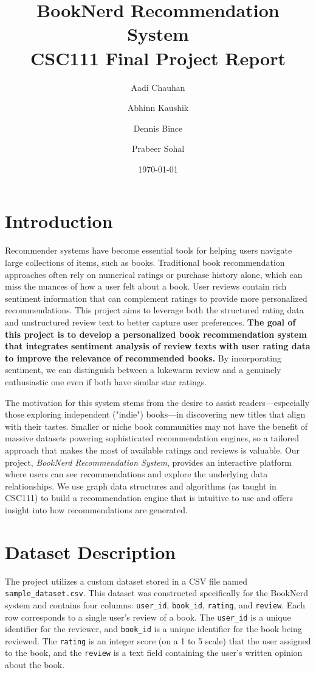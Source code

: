 \documentclass[12pt]{article}
\title{\textbf{BookNerd Recommendation System}\\
\large CSC111 Final Project Report}
\author{Aadi Chauhan \and Abhinn Kaushik \and Dennis Bince \and Prabeer Sohal}
\date{\today}
\begin{document}
\maketitle

\section{Introduction}

Recommender systems have become essential tools for helping users navigate large collections of items, such as books. Traditional book recommendation approaches often rely on numerical ratings or purchase history alone, which can miss the nuances of how a user felt about a book. User reviews contain rich sentiment information that can complement ratings to provide more personalized recommendations. This project aims to leverage both the structured rating data and unstructured review text to better capture user preferences. \textbf{The goal of this project is to develop a personalized book recommendation system that integrates sentiment analysis of review texts with user rating data to improve the relevance of recommended books.} By incorporating sentiment, we can distinguish between a lukewarm review and a genuinely enthusiastic one even if both have similar star ratings.

The motivation for this system stems from the desire to assist readers---especially those exploring independent ("indie") books---in discovering new titles that align with their tastes. Smaller or niche book communities may not have the benefit of massive datasets powering sophisticated recommendation engines, so a tailored approach that makes the most of available ratings and reviews is valuable. Our project, \textit{BookNerd Recommendation System}, provides an interactive platform where users can see recommendations and explore the underlying data relationships. We use graph data structures and algorithms (as taught in CSC111) to build a recommendation engine that is intuitive to use and offers insight into how recommendations are generated.

\section{Dataset Description}

The project utilizes a custom dataset stored in a CSV file named \texttt{sample\_dataset.csv}. This dataset was constructed specifically for the BookNerd system and contains four columns: \texttt{user\_id}, \texttt{book\_id}, \texttt{rating}, and \texttt{review}. Each row corresponds to a single user's review of a book. The \texttt{user\_id} is a unique identifier for the reviewer, and \texttt{book\_id} is a unique identifier for the book being reviewed. The \texttt{rating} is an integer score (on a 1 to 5 scale) that the user assigned to the book, and the \texttt{review} is a text field containing the user's written opinion about the book.
\end{document}
